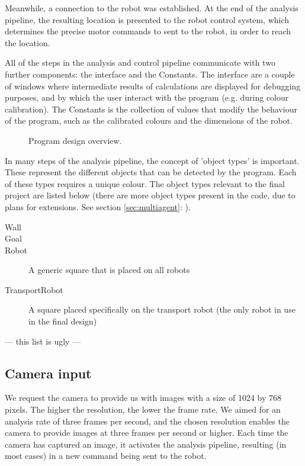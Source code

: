 \documentclass[10pt,twocolumn]{scrartcl}
\newcommand{\sref}[1]{section \vref{#1}: \nameref{#1}}
\begin{document}
Meanwhile, a connection to the robot was established. At the end of the analysis pipeline, the resulting location is presented to the robot control system, which determines the precise motor commands to sent to the robot, in order to reach the location.

All of the steps in the analysis and control pipeline communicate with two further components: the interface and the Constants. The interface are a couple of windows where intermediate results of calculations are displayed for debugging purposes, and by which the user interact with the program (e.g. during colour calibration). The Constants is the collection of values that modify the behaviour of the program, such as the calibrated colours and the dimensions of the robot.

\begin{figure}
	\begin{center}
	
	\end{center}
	\caption{\small Program design overview.}
	\label{fig:programOverview}
\end{figure}

In many steps of the analysis pipeline, the concept of 'object types' is important. These represent the different objects that can be detected by the program. Each of these types requires a unique colour. The object types relevant to the final project are listed below (there are more object types present in the code, due to plans for extensions. See \sref{sec:multiagent}).

\begin{description}
  \item[Wall]
  \item[Goal]
  \item[Robot] A generic square that is placed on all robots
  \item[TransportRobot] A square placed specifically on the transport robot (the only robot in use in the final design)
\end{description}

--- this list is ugly ---

\subsection{Camera input}
We request the camera to provide us with images with a size of 1024 by 768 pixels. The higher the resolution, the lower the frame rate. We aimed for an analysis rate of three frames per second, and the chosen resolution enables the camera to provide images at three frames per second or higher. Each time the camera has captured an image, it activates the analysis pipeline, resulting (in most cases) in a new command being sent to the robot.
\end{document}
